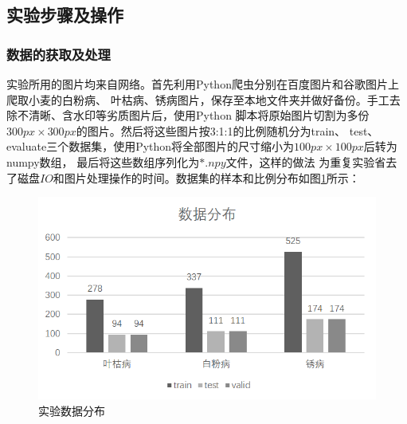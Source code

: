 \subsection{\hei\xiaosan\textbf{实验步骤及操作}}
  \subsubsection{\hei\sihao\textbf{数据的获取及处理}}
    

    实验所用的图片均来自网络。首先利用Python爬虫分别在百度图片和谷歌图片上爬取小麦的白粉病、
    叶枯病、锈病图片，保存至本地文件夹并做好备份。手工去除不清晰、含水印等劣质图片后，使用Python
    脚本将原始图片切割为多份$300px\times300px$的图片。然后将这些图片按3:1:1的比例随机分为train、
    test、evaluate三个数据集，使用Python将全部图片的尺寸缩小为$100px\times100px$后转为numpy数组，
    最后将这些数组序列化为$*.npy$文件，这样的做法
    为重复实验省去了磁盘$IO$和图片处理操作的时间。数据集的样本和比例分布如图\ref{Figure.Third.5}所示：

    \begin{figure}[htbp]
      \centering
      \includegraphics[width=.65\textwidth]{resource/second/data_ratio.bmp}
      \caption{实验数据分布}
      \label{Figure.Third.5}
    \end{figure}

